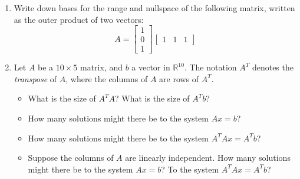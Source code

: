 \documentclass[11pt]{amsart}
\begin{document}
\begin{enumerate}
\begin{enumerate}
\item Write down bases for the range and nullspace of the following matrix, written as the outer product of two vectors: 
\[
A = \begin{bmatrix}
1 \\ 0 \\ 1
\end{bmatrix} 
\begin{bmatrix}
1 & 1 & 1
\end{bmatrix} 
\]

\item Let $A$ be a $10 \times 5$ matrix, and $b$ a vector in $\mathbb{R}^{10}$.  The notation $A^T$ denotes the {\it transpose} of $A$, where the columns of $A$ are rows of $A^T$.
\begin{itemize}
\item What is the size of $A^TA$? What is the size of $A^Tb$?
\item How many solutions might there be to the system $Ax = b$? 
\item How many solutions might there be to the system $A^TA x = A^T b$?
\item Suppose the columns of $A$ are linearly independent. How many solutions might there be to the system $Ax=b$? To the system $A^TAx = A^Tb$?
\end{itemize}




\end{enumerate} 



\end{enumerate}

\bigskip \bigskip
\end{document}
